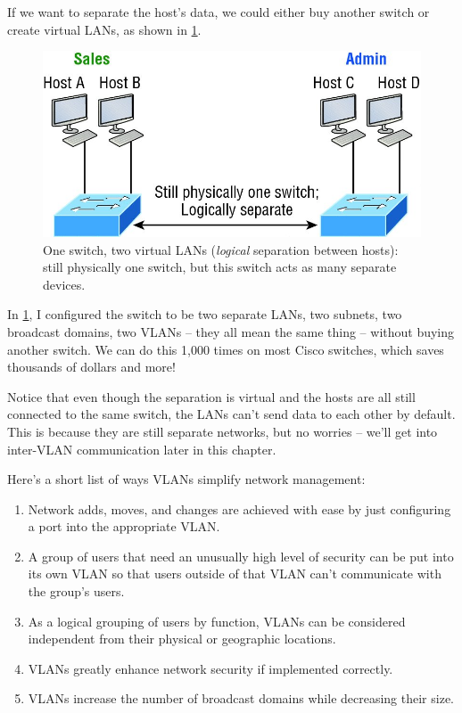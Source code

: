 If we want to separate the host's data, we could either buy another
switch or create virtual LANs, as shown in \cref{fig:one-switch-two-lan}.

\begin{figure}
   \centering
   \includegraphics{images/c11f004.jpg}
   \caption[One switch, two virtual LANs]{One switch, two virtual LANs (\emph{logical} separation between hosts): still physically one switch, but this switch acts as many separate devices.}
   \label{fig:one-switch-two-lan}
\end{figure}

In \cref{fig:one-switch-two-lan}, I configured the switch to be two separate LANs, two subnets, two broadcast domains, two VLANs -- they all mean the same thing -- without buying another switch.
We can do this 1,000 times on most Cisco switches, which saves thousands of dollars and more!

Notice that even though the separation is virtual and the hosts are all still connected to the same switch, the LANs can't send data to each other by default.
This is because they are still separate networks, but no worries -- we'll get into inter-VLAN communication later in this chapter.

Here's a short list of ways VLANs simplify network management:

\begin{enumerate}
   \item
      Network adds, moves, and changes are achieved with ease by just configuring a port into the appropriate VLAN.
   \item
      A group of users that need an unusually high level of security can be put into its own VLAN so that users outside of that VLAN can't communicate with the group's users.
   \item
   As a logical grouping of users by function, VLANs can be considered independent from their physical or geographic locations.
   \item
   VLANs greatly enhance network security if implemented correctly.
   \item
   VLANs increase the number of broadcast domains while decreasing their size.
\end{enumerate}

